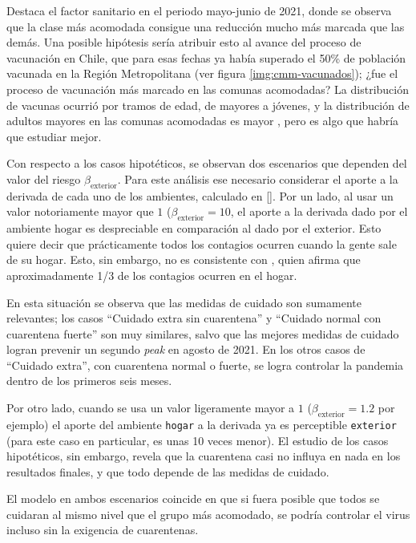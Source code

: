 Destaca el factor sanitario en el periodo mayo-junio de 2021, donde se observa que la clase más acomodada consigue una reducción mucho más marcada que las demás. Una posible hipótesis sería atribuir esto al avance del proceso de vacunación en Chile, que para esas fechas ya había superado el 50\% de población vacunada en la Región Metropolitana (ver figura \ref{img:cmm-vacunados}); ¿fue el proceso de vacunación más marcado en las comunas acomodadas? La distribución de vacunas ocurrió por tramos de edad, de mayores a jóvenes, y la distribución de adultos mayores en las comunas acomodadas es mayor \cite{LaTercera}, pero es algo que habría que estudiar mejor.

Con respecto a los casos hipotéticos, se observan dos escenarios que dependen del valor del riesgo \(\beta_{\text{exterior}}\). Para este análisis ese necesario considerar el aporte a la derivada de cada uno de los ambientes, calculado en \ref{}. 
Por un lado, al usar un valor notoriamente mayor que \(1\) (\(\beta_{\text{exterior}} = 10\), el aporte a la derivada dado por el ambiente \(\text{hogar}\) es despreciable en comparación al dado por el \(\text{exterior}\). Esto quiere decir que prácticamente todos los contagios ocurren cuando la gente sale de su hogar. Esto, sin embargo, no es consistente con \cite{Ferguson2020}, quien afirma que aproximadamente 1/3 de los contagios ocurren en el hogar.

En esta situación se observa que las medidas de cuidado son sumamente relevantes; los casos ``Cuidado extra sin cuarentena'' y ``Cuidado normal con cuarentena fuerte'' son muy similares, salvo que las mejores medidas de cuidado logran prevenir un segundo \textit{peak} en agosto de 2021. En los otros casos de ``Cuidado extra'', con cuarentena normal o fuerte, se logra controlar la pandemia dentro de los primeros seis meses.

Por otro lado, cuando se usa un valor ligeramente mayor a \(1\) (\(\beta_{\text{exterior}} = 1.2\) por ejemplo) el aporte del ambiente \texttt{hogar} a la derivada ya es perceptible \texttt{exterior} (para este caso en particular, es unas 10 veces menor). El estudio de los casos hipotéticos, sin embargo, revela que la cuarentena casi no influya en nada en los resultados finales, y que todo depende de las medidas de cuidado.

El modelo en ambos escenarios coincide en que si fuera posible que todos se cuidaran al mismo nivel que el grupo más acomodado, se podría controlar el virus incluso sin la exigencia de cuarentenas.

